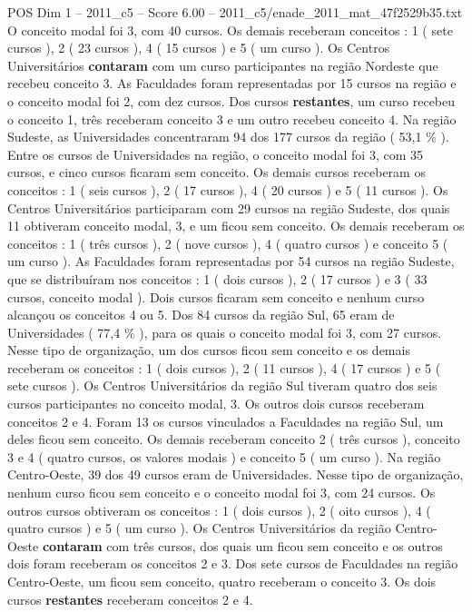 \begin{textsample}{POS Dim 1 – 2011\_c5 – Score 6.00 – 2011\_c5/enade\_2011\_mat\_47f2529b35.txt}
O conceito modal foi 3, com 40 cursos.
Os demais receberam conceitos : 1 ( sete cursos ), 2 ( 23 cursos ), 4 ( 15 cursos ) e 5 ( um curso ).
Os Centros Universitários \textbf{contaram} com um curso participantes na região Nordeste que recebeu conceito 3.
As Faculdades foram representadas por 15 cursos na região e o conceito modal foi 2, com dez cursos.
Dos cursos \textbf{restantes}, um curso recebeu o conceito 1, três receberam conceito 3 e um outro recebeu conceito 4.
Na região Sudeste, as Universidades concentraram 94 dos 177 cursos da região ( 53,1 \% ).
Entre os cursos de Universidades na região, o conceito modal foi 3, com 35 cursos, e cinco cursos ficaram sem conceito.
Os demais cursos receberam os conceitos : 1 ( seis cursos ), 2 ( 17 cursos ), 4 ( 20 cursos ) e 5 ( 11 cursos ).
Os Centros Universitários participaram com 29 cursos na região Sudeste, dos quais 11 obtiveram conceito modal, 3, e um ficou sem conceito.
Os demais receberam os conceitos : 1 ( três cursos ), 2 ( nove cursos ), 4 ( quatro cursos ) e conceito 5 ( um curso ).
As Faculdades foram representadas por 54 cursos na região Sudeste, que se distribuíram nos conceitos : 1 ( dois cursos ), 2 ( 17 cursos ) e 3 ( 33 cursos, conceito modal ).
Dois cursos ficaram sem conceito e nenhum curso alcançou os conceitos 4 ou 5.
Dos 84 cursos da região Sul, 65 eram de Universidades ( 77,4 \% ), para os quais o conceito modal foi 3, com 27 cursos.
Nesse tipo de organização, um dos cursos ficou sem conceito e os demais receberam os conceitos : 1 ( dois cursos ), 2 ( 11 cursos ), 4 ( 17 cursos ) e 5 ( sete cursos ).
Os Centros Universitários da região Sul tiveram quatro dos seis cursos participantes no conceito modal, 3.
Os outros dois cursos receberam conceitos 2 e 4.
Foram 13 os cursos vinculados a Faculdades na região Sul, um deles ficou sem conceito.
Os demais receberam conceito 2 ( três cursos ), conceito 3 e 4 ( quatro cursos, os valores modais ) e conceito 5 ( um curso ).
Na região Centro-Oeste, 39 dos 49 cursos eram de Universidades.
Nesse tipo de organização, nenhum curso ficou sem conceito e o conceito modal foi 3, com 24 cursos.
Os outros cursos obtiveram os conceitos : 1 ( dois cursos ), 2 ( oito cursos ), 4 ( quatro cursos ) e 5 ( um curso ).
Os Centros Universitários da região Centro-Oeste \textbf{contaram} com três cursos, dos quais um ficou sem conceito e os outros dois foram receberam os conceitos 2 e 3.
Dos sete cursos de Faculdades na região Centro-Oeste, um ficou sem conceito, quatro receberam o conceito 3.
Os dois cursos \textbf{restantes} receberam conceitos 2 e 4.

\end{textsample}
